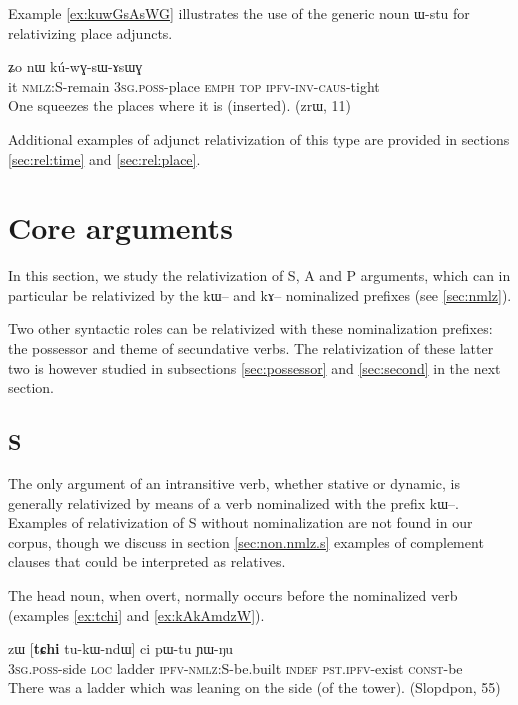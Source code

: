 \documentclass[oldfontcommands,oneside,a4paper,11pt]{article}
\newcommand{\ipa}[1]{{\phon #1}} %
\begin{document}
Example \ref{ex:kuwGsAsWG} illustrates the use of the generic noun \ipa{ɯ-stu} for relativizing place adjuncts.

\begin{exe}
\ex \label{ex:kuwGsAsWG}
\gll
[\ipa{ɯʑo}  	\ipa{kɯ-rɤʑi}]  	\ipa{ɯ-stu} \ipa{ʑo} 	\ipa{nɯ}  	\ipa{kú-wɣ-sɯ-ɤsɯɣ}  \\
it \textsc{nmlz:S}-remain \textsc{3sg.poss}-place \textsc{emph} \textsc{top}  \textsc{ipfv-inv-caus}-tight \\
\glt One squeezes the places where it is (inserted). (zrɯ, 11)
  \end{exe}

Additional examples of adjunct relativization of this type are provided in sections \ref{sec:rel:time} and \ref{sec:rel:place}.

\section{Core arguments} \label{sec:core}
In this section, we study the relativization of S, A and P arguments, which can in particular be relativized by the \ipa{kɯ}-- and \ipa{kɤ}-- nominalized prefixes (see \ref{sec:nmlz}).

Two other syntactic roles can be relativized with these nominalization prefixes: the possessor and theme of secundative verbs. The relativization of these latter two is however studied in subsections \ref{sec:possessor} and \ref{sec:second} in the next section.

\subsection{S} \label{sec:s.rel}
The only argument of an intransitive verb, whether stative or dynamic, is generally relativized by means of a verb nominalized with the prefix \ipa{kɯ}--. Examples of relativization of S without nominalization are   not found in our corpus, though we discuss in section \ref{sec:non.nmlz.s} examples of complement clauses that could be interpreted as relatives.

The head noun, when overt, normally occurs   before the nominalized verb (examples \ref{ex:tchi} and \ref{ex:kAkAmdzW}). 

 
 \begin{exe}
   \ex   \label{ex:tchi}
 \gll  	\ipa{ɯ-ɣmbɤj}  	\ipa{zɯ}  	[\textbf{\ipa{tɕhi}}  	\ipa{tu-kɯ-ndɯ}]  	\ipa{ci}  	\ipa{pɯ-tu}  	\ipa{ɲɯ-ŋu}  		\\
\textsc{3sg.poss}-side \textsc{loc} ladder \textsc{ipfv-nmlz:S}-be.built  \textsc{indef} \textsc{pst.ipfv}-exist \textsc{const}-be  \\
 \glt    There was a ladder which was leaning on the side (of the tower). (Slopdpon, 55)
   \end{exe} 
\end{document}

